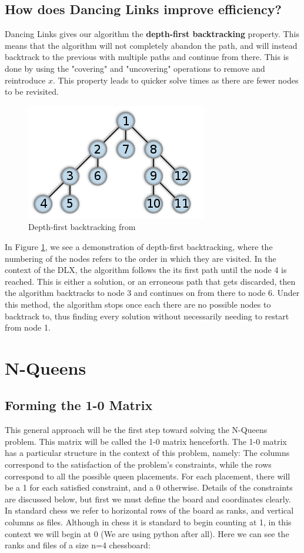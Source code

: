 \documentclass{article}
\begin{document}
\subsection{How does Dancing Links improve efficiency?}
Dancing Links gives our algorithm the \textbf{depth-first backtracking} property. This means that the algorithm will not completely abandon the path, and will instead backtrack to the previous with multiple paths and continue from there. This is done by using the "covering" and "uncovering" operations to remove and reintroduce $x$. This property leads to quicker solve times as there are fewer nodes to be revisited.
\begin{figure}[ht]
\includegraphics[scale=1]{images/depth-first.png}
\caption{Depth-first backtracking from \cite{backtrackfig}}
\label{fig: Depth-first backtracking}
\end{figure}
In Figure \ref{fig: Depth-first backtracking}, we see a demonstration of depth-first backtracking, where the numbering of the nodes refers to the order in which they are visited. In the context of the DLX, the algorithm follows the its first path until the node 4 is reached. This is either a solution, or an erroneous path that gets discarded, then the algorithm backtracks to node 3 and continues on from there to node 6. Under this method, the algorithm stops once each there are no possible nodes to backtrack to, thus finding every solution without necessarily needing to restart from node 1.
\clearpage
\section{N-Queens}
\subsection{Forming the 1-0 Matrix}
This general approach will be the first step toward solving the N-Queens problem. This matrix will be called the 1-0 matrix henceforth. The 1-0 matrix has a particular structure in the context of this problem, namely: The columns correspond to the satisfaction of the problem’s constraints, while the rows correspond to all the possible queen placements. For each placement, there will be a 1 for each satisfied constraint, and a 0 otherwise. Details of the constraints are discussed below, but first we must define the board and coordinates clearly.
In standard chess we refer to horizontal rows of the board as ranks, and vertical columns as files. Although in chess it is standard to begin counting at 1, in this context we will begin at 0 (We are using python after all).
Here we can see the ranks and files of a size n=4 chessboard:
\end{document}
